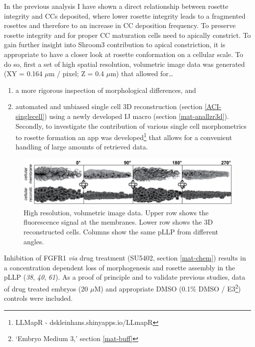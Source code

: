 \documentclass[10pt, b5paper, singlespacinge, twoside]{reedthesis} %
\providecommand{\tightlist}{%
  \setlength{\itemsep}{0pt}\setlength{\parskip}{0pt}}
\theoremstyle{definition}
\theoremstyle{definition}
\theoremstyle{definition}
\theoremstyle{remark}
\begin{document}
In the previous analysis I have shown a direct relationship between rosette integrity and CCs deposited, where lower rosette integrity leads to a fragmented rosettes and therefore to an increase in CC deposition frequency. To preserve rosette integrity and for proper CC maturation cells need to apically constrict. To gain further insight into Shroom3 contribution to apical constriction, it is appropriate to have a closer look at rosette conformation on a cellular scale. To do so, first a set of high spatial resolution, volumetric image data was generated (XY = 0.164 \(\mu\)m / pixel; Z = 0.4 \(\mu\)m) that allowed for\ldots{}
\begin{enumerate}
\def\labelenumi{\arabic{enumi}.}
\tightlist
\item
  a more rigorous inspection of morphological differences, and
\item
  automated and unbiased single cell 3D reconstruction (section \ref{ACI-singlecell}) using a newly developed IJ macro (section \ref{mat-anallzr3d}). Secondly, to investigate the contribution of various single cell morphometrics to rosette formation an app was developed\footnote{LLMapR - dskleinhans.shinyapps.io/LLmapR} that allows for a convenient handling of large amounts of retrieved data.
\end{enumerate}

\begin{figure}[H]

{\centering \includegraphics[width=0.95\linewidth]{figures/results/04_constriction/reconstriction_data} 

}

\caption[High resolution, volumetric image data]{High resolution, volumetric image data. Upper row shows the fluorescence signal at the membranes. Lower row shows the 3D reconstructed cells. Columns show the same pLLP from different angles.}\label{fig:acdata}
\end{figure}
Inhibition of FGFR1 \emph{via} drug treatment (SU5402, section \ref{mat-chem}) results in a concentration dependent loss of morphogenesis and rosette assembly in the pLLP (\emph{38}, \emph{40}, \emph{61}). As a proof of principle and to validate previous studies, data of drug treated embryos (20 \(\mu\)M) and appropriate DMSO (0.1\(\%\) DMSO / E3\footnote{`Embryo Medium 3,' section \ref{mat-buff}}) controls were included.
\end{document}
